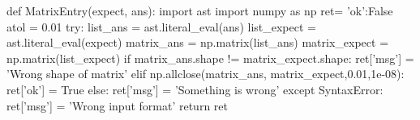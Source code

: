 \begin{edXscript}
def MatrixEntry(expect, ans):
  	import ast
	import numpy as np 
	ret= {'ok':False}
  	atol = 0.01
  	try:
		list_ans = ast.literal_eval(ans)
		list_expect = ast.literal_eval(expect)
  		matrix_ans = np.matrix(list_ans)
  		matrix_expect = np.matrix(list_expect) 
  		if matrix_ans.shape != matrix_expect.shape:
  			ret['msg'] = 'Wrong shape of matrix'
  		elif np.allclose(matrix_ans, matrix_expect,0.01,1e-08):
  			ret['ok'] = True
  		else:
  			ret['msg'] = 'Something is wrong'
	except SyntaxError:
		ret['msg'] = 'Wrong input format'
  	return ret
\end{edXscript}
